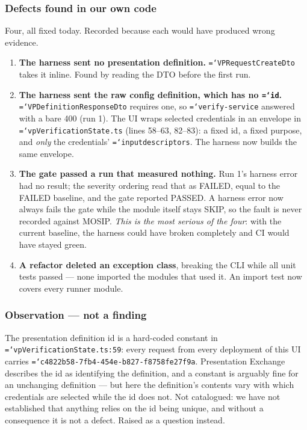 \documentclass[11pt,a4paper]{article}
\newcommand{\tightlist}{\setlength{\itemsep}{0pt}\setlength{\parskip}{0pt}\setlength{\parsep}{0pt}}
\let\origtexttt\texttt
\renewcommand{\texttt}[1]{\origtexttt{\hyphenchar\font=`\-\relax #1}}
\renewcommand{\_}{\textunderscore\allowbreak}
\begin{document}
\subsubsection*{Defects found in our own code}
Four, all fixed today. Recorded because each would have produced wrong evidence.
\begin{enumerate}\tightlist
  \item \textbf{The harness sent no presentation definition.} \texttt{VPRequestCreateDto} takes it
        inline. Found by reading the DTO before the first run.
  \item \textbf{The harness sent the raw config definition, which has no \texttt{id}.}
        \texttt{VPDefinitionResponseDto} requires one, so \texttt{verify-service} answered with
        a bare 400 (run 1). The UI wraps selected credentials in an envelope in
        \texttt{vpVerificationState.ts} (lines 58--63, 82--83): a fixed id, a fixed purpose,
        and \emph{only} the credentials' \texttt{input\_descriptors}. The harness now builds
        the same envelope.
  \item \textbf{The gate passed a run that measured nothing.} Run 1's harness error had no
        result; the severity ordering read that as FAILED, equal to the FAILED baseline, and
        the gate reported PASSED. A harness error now always fails the gate while the module
        itself stays SKIP, so the fault is never recorded against MOSIP. \emph{This is the
        most serious of the four}: with the current baseline, the harness could have broken
        completely and CI would have stayed green.
  \item \textbf{A refactor deleted an exception class}, breaking the CLI while all unit tests
        passed --- none imported the modules that used it. An import test now covers every
        runner module.
\end{enumerate}

\subsubsection*{Observation --- not a finding}
The presentation definition id is a hard-coded constant in
\texttt{vpVerificationState.ts:59}: every request from every deployment of this UI carries
\texttt{c4822b58-7fb4-454e-b827-f8758fe27f9a}. Presentation Exchange describes the id as
identifying the definition, and a constant is arguably fine for an unchanging definition ---
but here the definition's contents vary with which credentials are selected while the id
does not. Not catalogued: we have not established that anything relies on the id being
unique, and without a consequence it is not a defect. Raised as a question instead.
\end{document}
